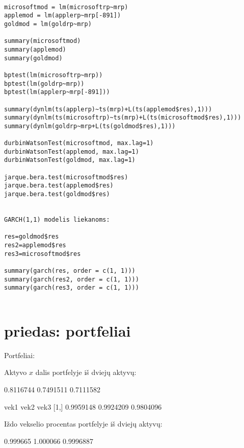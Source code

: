 \documentclass[12pt, a14paper, lithuanian]{article}
\begin{document}
\begin{verbatim}

microsoftmod = lm(microsoftrp~mrp)
applemod = lm(applerp~mrp[-891])
goldmod = lm(goldrp~mrp)

summary(microsoftmod)
summary(applemod)
summary(goldmod)

bptest(lm(microsoftrp~mrp))
bptest(lm(goldrp~mrp))
bptest(lm(applerp~mrp[-891]))

summary(dynlm(ts(applerp)~ts(mrp)+L(ts(applemod$res),1)))
summary(dynlm(ts(microsoftrp)~ts(mrp)+L(ts(microsoftmod$res),1)))
summary(dynlm(goldrp~mrp+L(ts(goldmod$res),1)))
 
durbinWatsonTest(microsoftmod, max.lag=1)
durbinWatsonTest(applemod, max.lag=1) 
durbinWatsonTest(goldmod, max.lag=1)  

jarque.bera.test(microsoftmod$res)
jarque.bera.test(applemod$res)
jarque.bera.test(goldmod$res)


GARCH(1,1) modelis liekanoms:

res=goldmod$res
res2=applemod$res
res3=microsoftmod$res

summary(garch(res, order = c(1, 1)))
summary(garch(res2, order = c(1, 1)))
summary(garch(res3, order = c(1, 1)))


\end{verbatim}

\section{priedas: portfeliai}
Portfeliai:


\label{C1}
 Aktyvo $x$ dalis portfelyje iš dviejų aktyvų:

\begin{Schunk}
\begin{Soutput}
          [,1]      [,2]      [,3]
[1,] 0.8116744 0.7491511 0.7111582
\end{Soutput}
\begin{Soutput}
          vek1      vek2      vek3
[1,] 0.9959148 0.9924209 0.9804096
\end{Soutput}
\end{Schunk}

 Iždo vekselio procentas portfelyje iš dviejų aktyvų:


\begin{Schunk}
\begin{Soutput}
         [,1]     [,2]      [,3]
[1,] 0.999665 1.000066 0.9996887
\end{Soutput}
\end{Schunk}
\end{document}
